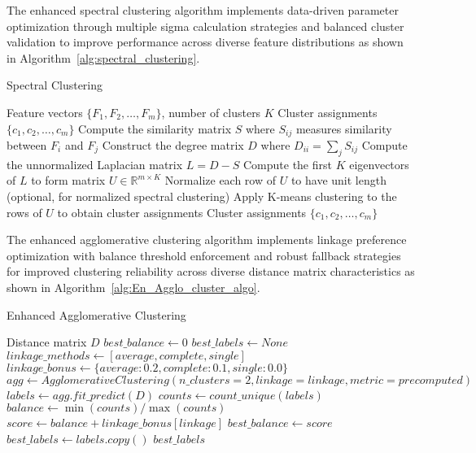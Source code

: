 The enhanced spectral clustering algorithm implements data-driven parameter optimization through multiple sigma calculation strategies and balanced cluster validation to improve performance across diverse feature distributions as shown in Algorithm~\ref{alg:spectral_clustering}.


\begin{algorithm}
\caption{Spectral Clustering}
\label{alg:spectral_clustering}
\begin{algorithmic}[1]
\REQUIRE Feature vectors $\{F_1, F_2, \ldots, F_m\}$, number of clusters $K$
\ENSURE Cluster assignments $\{c_1, c_2, \ldots, c_m\}$
\STATE Compute the similarity matrix $S$ where $S_{ij}$ measures similarity between $F_i$ and $F_j$
\STATE Construct the degree matrix $D$ where $D_{ii} = \sum_{j} S_{ij}$
\STATE Compute the unnormalized Laplacian matrix $L = D - S$
\STATE Compute the first $K$ eigenvectors of $L$ to form matrix $U \in \mathbb{R}^{m \times K}$
\STATE Normalize each row of $U$ to have unit length (optional, for normalized spectral clustering)
\STATE Apply K-means clustering to the rows of $U$ to obtain cluster assignments
\STATE \RETURN Cluster assignments $\{c_1, c_2, \ldots, c_m\}$
\end{algorithmic}
\end{algorithm}

The enhanced agglomerative clustering algorithm implements linkage preference optimization with balance threshold enforcement and robust fallback strategies for improved clustering reliability across diverse distance matrix characteristics as shown in Algorithm~\ref{alg:En_Agglo_cluster_algo}.


\begin{algorithm}
\caption{Enhanced Agglomerative Clustering}
\label{alg:En_Agglo_cluster_algo}
\begin{algorithmic}[1]
\REQUIRE Distance matrix $D$
\STATE $best\_balance \leftarrow 0$
\STATE $best\_labels \leftarrow None$
\STATE $linkage\_methods \leftarrow [average, complete, single]$
\STATE $linkage\_bonus \leftarrow \{average: 0.2, complete: 0.1, single: 0.0\}$
    \STATE $agg \leftarrow AgglomerativeClustering(n\_clusters=2, linkage=linkage, metric=precomputed)$
    \STATE $labels \leftarrow agg.fit\_predict(D)$
    \STATE $counts \leftarrow count\_unique(labels)$
    \STATE $balance \leftarrow \min(counts) / \max(counts)$
    \STATE $score \leftarrow balance + linkage\_bonus[linkage]$
        \STATE $best\_balance \leftarrow score$
        \STATE $best\_labels \leftarrow labels.copy()$
    \ENDIF
\ENDFOR
\RETURN $best\_labels$
\end{algorithmic}
\end{algorithm}


